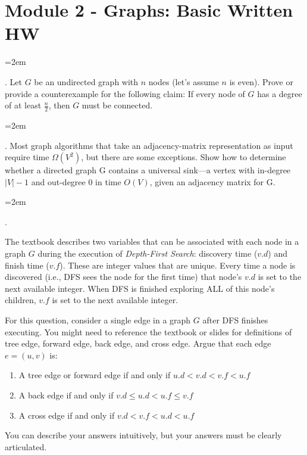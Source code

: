 \documentclass[12pt]{article}
\def\homework{Module 2 - Graphs: Basic Written HW}
\newcounter{quesnum}
\newcommand{\question}[2][??]{
\begin{list}{\labelitemi}{\leftmargin=2em}
\item [\arabic{quesnum}.] {#2}
\end{list}
\addtocounter{quesnum}{1}
}
\begin{document}
\section*{\homework}



\question[3]{
Let $G$ be an undirected graph with $n$ nodes (let's assume $n$ is even). Prove or provide a counterexample for the following claim: If every node of $G$ has a degree of at least $\frac{n}{2}$, then $G$ must be connected.
}



\question[3]{
Most graph algorithms that take an adjacency-matrix representation as input require time $\Omega(V^2)$, but there are some exceptions. Show how to determine whether a directed graph G contains a universal sink—a vertex with in-degree $|V| - 1$ and out-degree $0$ in time $O(V)$, given an adjacency matrix for G.
}




\question[1]{
The textbook describes two variables that can be associated with each node in a graph $G$ during the execution of \emph{Depth-First Search}: discovery time ($v.d$) and finish time ($v.f$). These are integer values that are unique. Every time a node is discovered (i.e., DFS sees the node for the first time) that node's $v.d$ is set to the next available integer. When DFS is finished exploring ALL of this node's children, $v.f$ is set to the next available integer.

For this question, consider a single edge in a graph $G$ after DFS finishes executing. You might need to reference the textbook or slides for definitions of tree edge, forward edge, back edge, and cross edge. Argue that each edge $e=(u,v)$ is:

\begin{enumerate}
\item A tree edge or forward edge if and only if $u.d < v.d < v.f < u.f$
\item A back edge if and only if $v.d \leq u.d < u.f \leq v.f$
\item A cross edge if and only if $v.d < v.f < u.d < u.f$
\end{enumerate}

You can describe your answers intuitively, but your answers must be clearly articulated.
}
\end{document}
